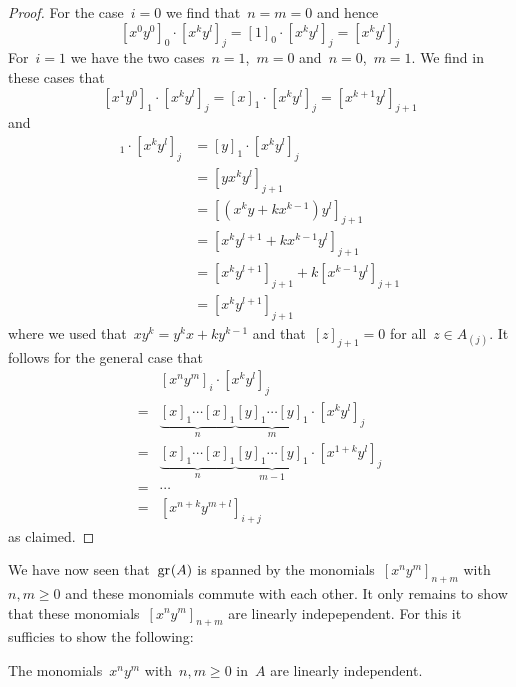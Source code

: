 \begin{example}
  \begin{proof}
    For the case~$i = 0$ we find that~$n = m = 0$ and hence
    \[
      [x^0 y^0]_0 \cdot [x^k y^l]_j
      =
      [1]_0 \cdot [x^k y^l]_j
      =
      [x^k y^l]_j
    \]
    For~$i = 1$ we have the two cases~$n = 1$,~$m = 0$ and~$n = 0$,~$m = 1$.
    We find in these cases that
    \[
      [x^1 y^0]_1 \cdot [x^k y^l]_j
      =
      [x]_1 \cdot [x^k y^l]_j
      =
      [x^{k+1} y^l]_{j+1}
    \]
    and
    \begin{align*}
      [x^0 y^1]_1 \cdot [x^k y^l]_j
      &=
      [y]_1 \cdot [x^k y^l]_j
      \\
      &=
      [y x^k y^l]_{j+1}
      \\
      &=
      [(x^k y + k x^{k-1}) y^l]_{j+1}
      \\
      &=
      [x^k y^{l+1} + k x^{k-1} y^l]_{j+1}
      \\
      &=
      [x^k y^{l+1}]_{j+1} + k [x^{k-1} y^l]_{j+1}
      \\
      &=
      [x^k y^{l+1}]_{j+1}
    \end{align*}
    where we used that~$x y^k = y^k x + k y^{k-1}$ and that~$[z]_{j+1} = 0$ for all~$z \in A_{(j)}$.
    It follows for the general case that
    \begin{align*}
      {}&
      [x^n y^m]_i \cdot [x^k y^l]_j
      \\
      ={}&
      \underbrace{ [x]_1 \dotsm [x]_1 }_{n}
      \underbrace{ [y]_1 \dotsm [y]_1 }_{m}
      \cdot
      [x^k y^l]_j
      \\
      ={}&
      \underbrace{ [x]_1 \dotsm [x]_1 }_{n}
      \underbrace{ [y]_1 \dotsm [y]_1 }_{m-1}
      \cdot
      [x^{1+k}  y^l]_j
      \\
      ={}&
      \dotsb
      \\
      ={}&
      [x^{n+k} y^{m+l}]_{i+j}
    \end{align*}
    as claimed.
  \end{proof}

  We have now seen that~$\gr(A)$ is spanned by the monomials~$[x^n y^m]_{n+m}$ with~$n, m \geq 0$ and these monomials commute with each other.
  It only remains to show that these monomials~$[x^n y^m]_{n+m}$ are linearly indepependent.
  For this it sufficies to show the following:
  
  \begin{claim}
    \label{linear independence of monomials}
    The monomials~$x^n y^m$ with~$n, m \geq 0$ in~$A$ are linearly independent.
  \end{claim}
  

\end{example}
